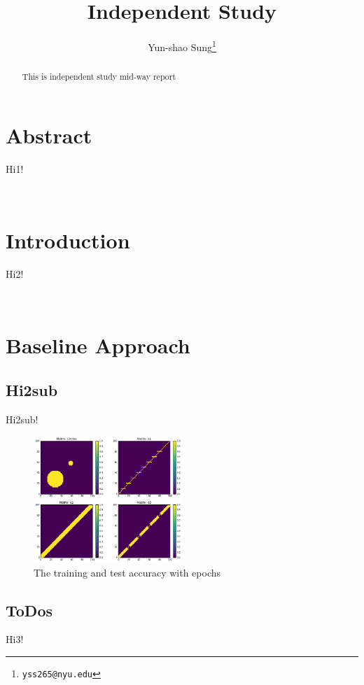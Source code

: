 \documentclass[final]{siamltexmm}
\title{Independent Study}
\author{Yun-shao Sung\thanks{\tt yss265@nyu.edu} }
\begin{document}
\maketitle

\begin{abstract}
This is independent study mid-way report
\end{abstract}

\pagestyle{myheadings}
\thispagestyle{plain}

\section{Abstract}
Hi1!

\\
\section{Introduction}
Hi2!

\\
\section{Baseline Approach}

\subsection{Hi2sub}
Hi2sub!

\begin{figure}[H]
  \centering
    \includegraphics[width=0.5\textwidth]{./figure/similarityMatrix.png}
  \caption{The training and test accuracy with epochs}
\end{figure}


\subsection{ToDos}
Hi3!
\end{document}

